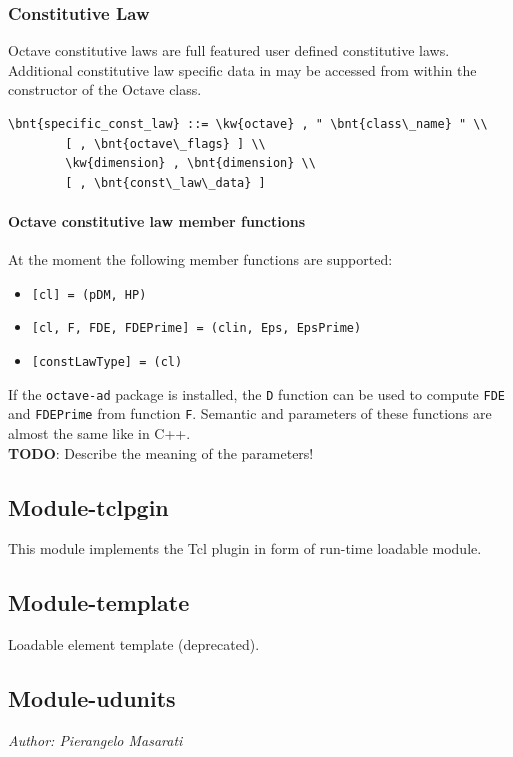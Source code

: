 \subsubsection{Constitutive Law}
Octave constitutive laws are full featured user defined constitutive laws.
Additional constitutive law specific data in  may be accessed from within the constructor of the Octave class.
\begin{Verbatim}[commandchars=\\\{\}]
    \bnt{specific_const_law} ::= \kw{octave} , " \bnt{class\_name} " \\
        [ , \bnt{octave\_flags} ] \\
        \kw{dimension} , \bnt{dimension} \\
        [ , \bnt{const\_law\_data} ]
\end{Verbatim}

\paragraph{Octave constitutive law member functions}
At the moment the following member functions are supported:
\begin{itemize}
\item \verb![cl] = !\verb!(pDM, HP) !
\item \verb![cl, F, FDE, FDEPrime] = !\verb!(clin, Eps, EpsPrime) !
\item \verb![constLawType] = !\verb!(cl) !
\end{itemize}
If the \texttt{octave-ad} package is installed, the \texttt{D} function
can be used to compute \texttt{FDE} and \texttt{FDEPrime}
from function \texttt{F}.
Semantic and parameters of these functions are almost the same like in C++. \\
\textbf{TODO}: Describe the meaning of the parameters!

\subsection{Module-tclpgin}
This module implements the Tcl plugin in form of run-time loadable module.
 
\subsection{Module-template}
Loadable element template (deprecated).

\subsection{Module-udunits}
\label{sec:modules:udunits}
\emph{Author: Pierangelo Masarati}

